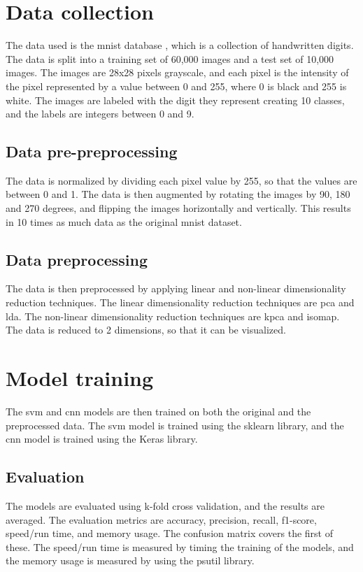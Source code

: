 \section{Data collection}\label{sec:data-collection}
The data used is the \gls{mnist} database \cite{lecun-mnist-database}, which is a collection of handwritten digits. The data is split into a training set of 60,000 images and a test set of 10,000 images. The images are 28x28 pixels grayscale, and each pixel is the intensity of the pixel represented by a value between 0 and 255, where 0 is black and 255 is white. The images are labeled with the digit they represent creating 10 classes, and the labels are integers between 0 and 9.

\subsection{Data pre-preprocessing}\label{subsec:data-pre-preprocessing}
The data is normalized by dividing each pixel value by 255, so that the values are between 0 and 1. The data is then augmented by rotating the images by 90, 180 and 270 degrees, and flipping the images horizontally and vertically. This results in 10 times as much data as the original \gls{mnist} dataset.

\subsection{Data preprocessing}\label{subsec:data-preprocessing}
The data is then preprocessed by applying linear and non-linear dimensionality reduction techniques. The linear dimensionality reduction techniques are \gls{pca} and \gls{lda}. The non-linear dimensionality reduction techniques are \gls{kpca} and \gls{isomap}. The data is reduced to 2 dimensions, so that it can be visualized.

\section{Model training}\label{sec:model-training}
The \gls{svm} and \gls{cnn} models are then trained on both the original and the preprocessed data. The \gls{svm} model is trained using the \gls{sklearn} library, and the \gls{cnn} model is trained using the Keras library.

\subsection{Evaluation}\label{subsec:evaluation}
The models are evaluated using k-fold cross validation, and the results are averaged. The evaluation metrics are accuracy, precision, recall, f1-score, speed/run time, and memory usage. The confusion matrix covers the first of these. The speed/run time is measured by timing the training of the models, and the memory usage is measured by using the psutil library.

